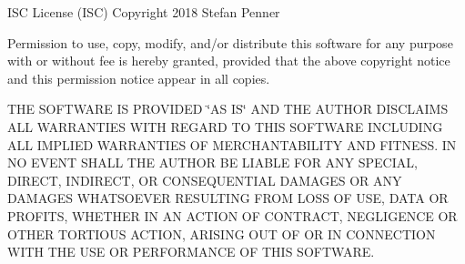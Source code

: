 ISC License (ISC) Copyright 2018 Stefan Penner

Permission to use, copy, modify, and/or distribute this software for any purpose with or without fee is hereby granted, provided that the above copyright notice and this permission notice appear in all copies.

THE SOFTWARE IS PROVIDED \char`\"{}\+AS IS\char`\"{} AND THE AUTHOR DISCLAIMS ALL WARRANTIES WITH REGARD TO THIS SOFTWARE INCLUDING ALL IMPLIED WARRANTIES OF MERCHANTABILITY AND FITNESS. IN NO EVENT SHALL THE AUTHOR BE LIABLE FOR ANY SPECIAL, DIRECT, INDIRECT, OR CONSEQUENTIAL DAMAGES OR ANY DAMAGES WHATSOEVER RESULTING FROM LOSS OF USE, DATA OR PROFITS, WHETHER IN AN ACTION OF CONTRACT, NEGLIGENCE OR OTHER TORTIOUS ACTION, ARISING OUT OF OR IN CONNECTION WITH THE USE OR PERFORMANCE OF THIS SOFTWARE. 